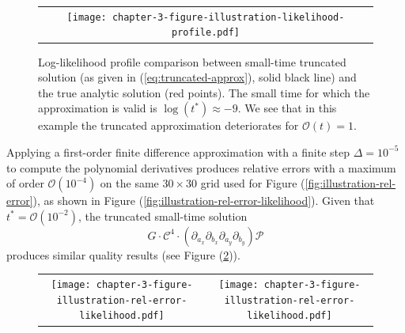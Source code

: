 \documentclass[10pt]{article}
\begin{document}
\begin{figure}
  \begin{tabular}{c}
    \begin{minipage}{0.90\textwidth}
      \centering
      \texttt{[image: chapter-3-figure-illustration-likelihood-profile.pdf]}
      \caption{Log-likelihood profile comparison between small-time
        truncated solution (as given in (\ref{eq:truncated-approx}),
        solid black line) and the true analytic solution (red
        points). The small time for which the approximation is valid
        is $\log(t^*) \approx -9$. We see that in this example the
        truncated approximation deteriorates for $\mathcal{O}(t) = 1$.}
      \label{fig:illustration-likelihood-profile}
    \end{minipage}
  \end{tabular}
\end{figure}
Applying a first-order finite difference
approximation with a finite step $\Delta = 10^{-5}$ to compute the
polynomial derivatives produces relative errors with a maximum of
order $\mathcal{O}(10^{-4})$ on the same $30 \times 30$ grid used for
Figure (\ref{fig:illustration-rel-error}), as shown in Figure
(\ref{fig:illustration-rel-error-likelihood}). Given that
$t^{*} = \mathcal{O}(10^{-2})$, the truncated small-time solution
\[G \cdot \mathcal{C}^4 \cdot \left(\partial_{a_x}\partial_{b_x}
    \partial_{a_y}\partial_{b_y} \right)\mathcal{P}\] produces similar
quality results (see Figure
(\ref{fig:illustration-rel-error-likelihood-truncated})).
\begin{figure}
  \begin{tabular}{cc}
    \begin{minipage}{0.40\textwidth}
      \centering
      \texttt{[image: chapter-3-figure-illustration-rel-error-likelihood.pdf]}
      \caption{}
      \label{fig:illustration-rel-error-likelihood}
    \end{minipage}
    & \begin{minipage}{0.40\textwidth}
      \centering
      \texttt{[image: chapter-3-figure-illustration-rel-error-likelihood.pdf]}
      \caption{}
      \label{fig:illustration-rel-error-likelihood-truncated}
    \end{minipage}
      \end{tabular}
\end{figure}

\end{document}

